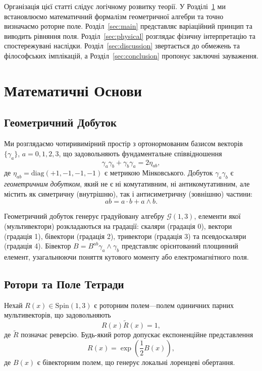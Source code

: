 \documentclass[11pt,a4paper]{article}
\numberwithin{equation}{section}
\theoremstyle{plain}
\theoremstyle{definition}
\theoremstyle{remark}
\begin{document}
Організація цієї статті слідує логічному розвитку теорії. У Розділі~\ref{sec:prelim} ми встановлюємо математичний формалізм геометричної алгебри та точно визначаємо роторне поле. Розділ~\ref{sec:main} представляє варіаційний принцип та виводить рівняння поля. Розділ~\ref{sec:physical} розглядає фізичну інтерпретацію та спостережувані наслідки. Розділ~\ref{sec:discussion} звертається до обмежень та філософських імплікацій, а Розділ~\ref{sec:conclusion} пропонує заключні зауваження.

\section{Математичні Основи}
\label{sec:prelim}

\subsection{Геометричний Добуток}

Ми розглядаємо чотиривимірний простір з ортонормованим базисом векторів $\{\gamma_a\}$, $a=0,1,2,3$, що задовольняють фундаментальне співвідношення
\begin{equation}
\gamma_a \gamma_b + \gamma_b \gamma_a = 2\eta_{ab},
\end{equation}
де $\eta_{ab}=\mathrm{diag}(+1,-1,-1,-1)$ є метрикою Мінковського. Добуток $\gamma_a \gamma_b$ є \emph{геометричним добутком}, який не є ні комутативним, ні антикомутативним, але містить як симетричну (внутрішню), так і антисиметричну (зовнішню) частини:
\begin{equation}
ab = a \cdot b + a \wedge b.
\end{equation}

Геометричний добуток генерує градуйовану алгебру $\mathcal{G}(1,3)$, елементи якої (мультивектори) розкладаються на градації: скаляри (градація 0), вектори (градація 1), бівектори (градація 2), тривектори (градація 3) та псевдоскаляри (градація 4). Бівектор $B = B^{ab}\gamma_a \wedge \gamma_b$ представляє орієнтований площинний елемент, узагальнюючи поняття кутового моменту або електромагнітного поля.

\subsection{Ротори та Поле Тетради}

Нехай $R(x) \in \mathrm{Spin}(1,3)$ є роторним полем---полем одиничних парних мультивекторів, що задовольняють
\begin{equation}
R(x)\widetilde{R}(x) = 1,
\end{equation}
де $\widetilde{R}$ позначає реверсію. Будь-який ротор допускає експоненційне представлення
\begin{equation}
R(x) = \exp\left(\frac{1}{2}B(x)\right),
\end{equation}
де $B(x)$ є бівекторним полем, що генерує локальні лоренцеві обертання.
\end{document}
